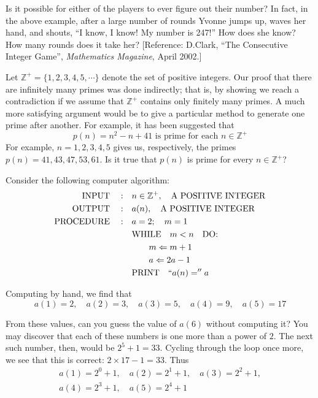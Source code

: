 \documentclass{article}
\newcommand{\0}{\mathbf 0}
\newcommand{\1}{\mathbf 1}
\newcommand\BZ{\mathbb Z^+}
\begin{document}
\begin{description}
    Is it possible for either of the players to ever figure out their number? In fact, in the above example, after a large number of rounds Yvonne jumps up, waves her hand, and shouts, ``I know, I know! My number is 247!'' How does she know? How many rounds does it take her? [Reference: D.Clark, ``The Consecutive Integer Game'', \emph{Mathematics Magazine}, April 2002.]

  \item[Example 2:] Let $\BZ = \{1,2,3,4,5,\cdots\}$ denote the set of positive integers. Our proof that there are infinitely many primes was done indirectly; that is, by showing we reach a contradiction if we assume that $\BZ$ contains only finitely many primes. A much more satisfying argument would be to give a particular method to generate one prime after another. For example, it has been suggested that
    \begin{equation*}
    p(n) = n^2 - n + 41 \text{ is prime for each } n \in \BZ
    \end{equation*}
    For example, $n = 1,2,3,4,5$ gives us, respectively, the primes $p(n) = 41, 43, 47, 53, 61$. Is it true that $p(n)$ is prime for every $n \in \BZ$?

  \item[Example 3:] Consider the following computer algorithm:
    \begin{align*}
    \qquad \text{INPUT} \quad : & \quad n \in \BZ, \quad \text{A POSITIVE INTEGER} \\
          \text{OUTPUT} \quad : & \quad a(n), \quad \text{A POSITIVE INTEGER} \\
       \text{PROCEDURE} \quad : & \quad a = 2; \quad m = 1 \\
                                & \quad \text{WHILE} \quad m < n \quad \text{DO:} \\
                                & \quad \qquad m \Leftarrow m+1 \\
                                & \quad \qquad a \Leftarrow 2a-1 \\
                                & \quad \text{PRINT} \quad ``a(n) ='' a
    \end{align*}

    Computing by hand, we find that
    \begin{equation*}
    a(1) = 2, \quad a(2) = 3, \quad a(3) = 5, \quad a(4) = 9, \quad a(5) = 17
    \end{equation*}

    From these values, can you guess the value of $a(6)$ without computing it? You may discover that each of these numbers is one more than a power of $2$. The next such number, then, would be $2^5 + 1 = 33$. Cycling through the loop once more, we see that this is correct: $2 \times 17 - 1 = 33$. Thus
    \begin{eqnarray*}
    a(1) = 2^0 + 1, \quad a(2) = 2^1 + 1, \quad a(3) = 2^2 + 1, \\
    a(4) = 2^3+1, \quad a(5) = 2^4+1
    \end{eqnarray*}


\end{description}
\end{document}
